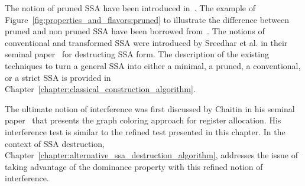 The notion of pruned SSA  have been introduced in~\cite{ChoiJan91}. The example of Figure~\ref{fig:properties_and_flavors:pruned} to illustrate the difference between pruned and non pruned SSA have been borrowed from~\cite{CytronOct91}. 
The notions of conventional and transformed SSA were introduced by Sreedhar et al. in their seminal paper~\cite{SreedharSep99} for destructing SSA form.
The description of the existing techniques to turn a general SSA into either a minimal, a pruned, a conventional, or a strict SSA is provided in Chapter~\ref{chapter:classical_construction_algorithm}.

The ultimate notion of interference was first discussed by Chaitin in his seminal paper~\cite{Chaitin81} that presents the graph coloring approach for register allocation. His interference test is similar to the refined test presented in this chapter. In the context of SSA destruction, Chapter~\ref{chapter:alternative_ssa_destruction_algorithm}, addresses the issue of taking advantage of the dominance property with this refined notion of interference.
 

